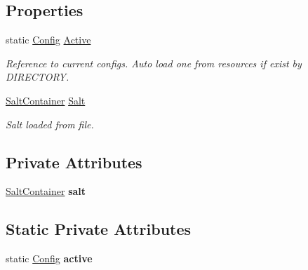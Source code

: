\subsection*{Properties}
\begin{DoxyCompactItemize}
\item 
static \mbox{\hyperlink{class_authority_controller_1_1_data_1_1_application_1_1_config}{Config}} \mbox{\hyperlink{class_authority_controller_1_1_data_1_1_application_1_1_config_a4473b20e9b91d2811ac3610da497a1bc}{Active}}
\begin{DoxyCompactList}\small\item\em Reference to current configs. Auto load one from resources if exist by D\+I\+R\+E\+C\+T\+O\+RY. \end{DoxyCompactList}\item 
\mbox{\hyperlink{class_authority_controller_1_1_data_1_1_application_1_1_salt_container}{Salt\+Container}} \mbox{\hyperlink{class_authority_controller_1_1_data_1_1_application_1_1_config_ac91189185d3ab6bf689bfaf37f83d9c1}{Salt}}
\begin{DoxyCompactList}\small\item\em Salt loaded from file. \end{DoxyCompactList}\end{DoxyCompactItemize}
\subsection*{Private Attributes}
\begin{DoxyCompactItemize}
\item 
\mbox{\label{class_authority_controller_1_1_data_1_1_application_1_1_config_abcf55c74cb4f50ee8a68e53a2f1fbf4c}} 
\mbox{\hyperlink{class_authority_controller_1_1_data_1_1_application_1_1_salt_container}{Salt\+Container}} {\bfseries salt}
\end{DoxyCompactItemize}
\subsection*{Static Private Attributes}
\begin{DoxyCompactItemize}
\item 
\mbox{\label{class_authority_controller_1_1_data_1_1_application_1_1_config_a889d164fa5479754663de6c2d64983ba}} 
static \mbox{\hyperlink{class_authority_controller_1_1_data_1_1_application_1_1_config}{Config}} {\bfseries active}
\end{DoxyCompactItemize}


